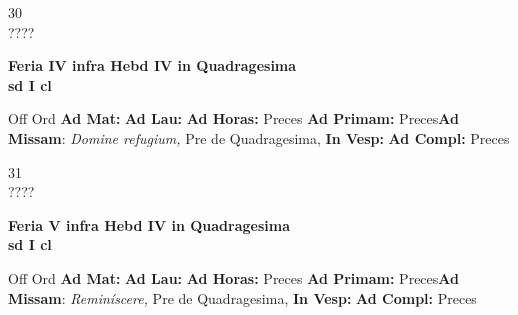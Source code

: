\documentclass[10pt, openany]{book}
\begin{document}
    \begin{center}
        \begin{minipage}{3.5in}
            \vspace{2em}
            \begin{minipage}{0.5in}
                {\Huge 30} \\
                {\normalsize ????}
            \end{minipage}
            \begin{minipage}{3.0in}
                \textbf{ \large Feria IV infra Hebd IV in Quadragesima  \\
                \textnormal{\normalsize sd I cl}}

            \end{minipage}
            \begin{justify}Off Ord
                \textbf{Ad Mat: }
                \textbf{Ad Lau: }
                \textbf{Ad Horas: }Preces
                \textbf{Ad Primam: }Preces\textbf{Ad Missam}: \textit{Domine refugium,} Pre de Quadragesima, 
                \textbf{In Vesp: }
                \textbf{Ad Compl: }Preces
            \end{justify}
        \end{minipage}
    \end{center}

    \begin{center}
        \begin{minipage}{3.5in}
            \vspace{2em}
            \begin{minipage}{0.5in}
                {\Huge 31} \\
                {\normalsize ????}
            \end{minipage}
            \begin{minipage}{3.0in}
                \textbf{ \large Feria V infra Hebd IV in Quadragesima  \\
                \textnormal{\normalsize sd I cl}}

            \end{minipage}
            \begin{justify}Off Ord
                \textbf{Ad Mat: }
                \textbf{Ad Lau: }
                \textbf{Ad Horas: }Preces
                \textbf{Ad Primam: }Preces\textbf{Ad Missam}: \textit{Reminíscere,} Pre de Quadragesima, 
                \textbf{In Vesp: }
                \textbf{Ad Compl: }Preces
            \end{justify}
        \end{minipage}
    \end{center}
\end{document}
